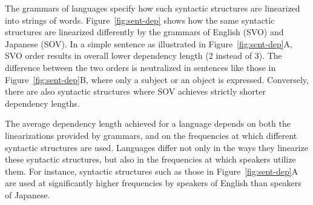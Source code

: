 \documentclass[9pt,twocolumn,twoside,lineno]{pnas-new}
\begin{document}
%
%

The grammars of languages specify how such syntactic structures are linearized into strings of words.
Figure~\ref{fig:sent-dep} shows how the same syntactic structures are linearized differently by the grammars of English (SVO) and Japanese (SOV).
In a simple sentence as illustrated in Figure~\ref{fig:sent-dep}A, SVO order results in overall lower dependency length (2 instead of 3).
The difference between the two orders is neutralized in sentences like those in Figure~\ref{fig:sent-dep}B, where only a subject or an object is expressed.
Conversely, there are also syntactic structures where SOV achieves strictly shorter dependency lengths. %

The average dependency length achieved for a language depends on both the linearizations provided by grammars, and on the frequencies at which different syntactic structures are used.
Languages differ not only in the ways they linearize these syntactic structures, but also in the frequencies at which speakers utilize them.
For instance, syntactic structures such as those in Figure~\ref{fig:sent-dep}A are used at significantly higher frequencies by speakers of English than speakers of Japanese.
\end{document}
